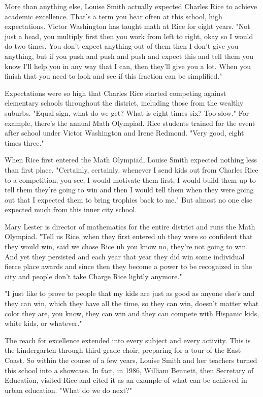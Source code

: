 More than anything else, Louise Smith actually expected Charles Rice to achieve academic excellence. That's a term you hear often at this school, high expectations. Victor Washington has taught math at Rice for eight years. "Not just a head, you multiply first then you work from left to right, okay so I would do two times. You don't expect anything out of them then I don't give you anything, but if you push and push and push and expect this and tell them you know I'll help you in any way that I can, then they'll give you a lot. When you finish that you need to look and see if this fraction can be simplified."

Expectations were so high that Charles Rice started competing against elementary schools throughout the district, including those from the wealthy suburbs. "Equal sign, what do we get? What is eight times six? Too slow." For example, there's the annual Math Olympiad. Rice students trained for the event after school under Victor Washington and Irene Redmond. "Very good, eight times three."

When Rice first entered the Math Olympiad, Louise Smith expected nothing less than first place. "Certainly, certainly, whenever I send kids out from Charles Rice to a competition, you see, I would motivate them first, I would build them up to tell them they're going to win and then I would tell them when they were going out that I expected them to bring trophies back to me." But almost no one else expected much from this inner city school.

Mary Lester is director of mathematics for the entire district and runs the Math Olympiad. "Tell us Rice, when they first entered uh they were so confident that they would win, said we chose Rice uh you know no, they're not going to win. And yet they persisted and each year that year they did win some individual fierce place awards and since then they become a power to be recognized in the city and people don't take Charge Rice lightly anymore."

"I just like to prove to people that my kids are just as good as anyone else's and they can win, which they have all the time, so they can win, doesn't matter what color they are, you know, they can win and they can compete with Hispanic kids, white kids, or whatever."

The reach for excellence extended into every subject and every activity. This is the kindergarten through third grade choir, preparing for a tour of the East Coast. So within the course of a few years, Louise Smith and her teachers turned this school into a showcase. In fact, in 1986, William Bennett, then Secretary of Education, visited Rice and cited it as an example of what can be achieved in urban education. "What do we do next?"

